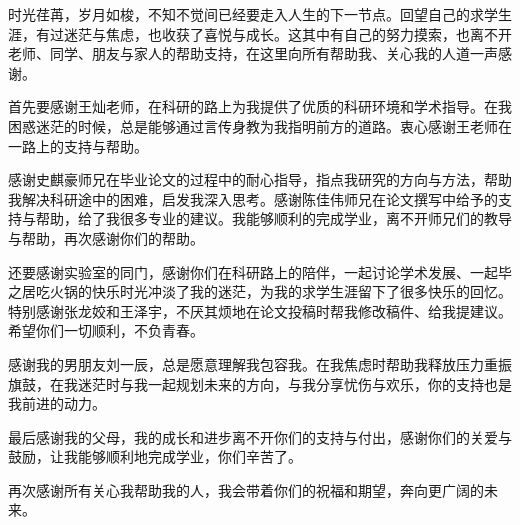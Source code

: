 \cleardoublepage
{}

时光荏苒，岁月如梭，不知不觉间已经要走入人生的下一节点。回望自己的求学生涯，有过迷茫与焦虑，也收获了喜悦与成长。这其中有自己的努力摸索，也离不开老师、同学、朋友与家人的帮助支持，在这里向所有帮助我、关心我的人道一声感谢。

首先要感谢王灿老师，在科研的路上为我提供了优质的科研环境和学术指导。在我困惑迷茫的时候，总是能够通过言传身教为我指明前方的道路。衷心感谢王老师在一路上的支持与帮助。

感谢史麒豪师兄在毕业论文的过程中的耐心指导，指点我研究的方向与方法，帮助我解决科研途中的困难，启发我深入思考。感谢陈佳伟师兄在论文撰写中给予的支持与帮助，给了我很多专业的建议。我能够顺利的完成学业，离不开师兄们的教导与帮助，再次感谢你们的帮助。

还要感谢实验室的同门，感谢你们在科研路上的陪伴，一起讨论学术发展、一起毕之居吃火锅的快乐时光冲淡了我的迷茫，为我的求学生涯留下了很多快乐的回忆。特别感谢张龙姣和王泽宇，不厌其烦地在论文投稿时帮我修改稿件、给我提建议。希望你们一切顺利，不负青春。

感谢我的男朋友刘一辰，总是愿意理解我包容我。在我焦虑时帮助我释放压力重振旗鼓，在我迷茫时与我一起规划未来的方向，与我分享忧伤与欢乐，你的支持也是我前进的动力。

最后感谢我的父母，我的成长和进步离不开你们的支持与付出，感谢你们的关爱与鼓励，让我能够顺利地完成学业，你们辛苦了。

再次感谢所有关心我帮助我的人，我会带着你们的祝福和期望，奔向更广阔的未来。


